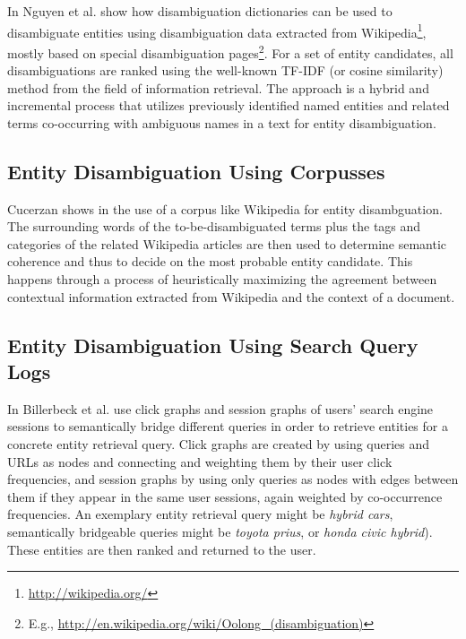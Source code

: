 \documentclass[twocolumn]{article}
\begin{document}
In \cite{Nguyen:NamedEntity} Nguyen et al. show how disambiguation dictionaries can be used to disambiguate entities
using disambiguation data extracted from Wikipedia\footnote{\url{http://wikipedia.org/}}, mostly based on special
disambiguation pages\footnote{E.g., \url{http://en.wikipedia.org/wiki/Oolong_(disambiguation)}}. For a set of entity
candidates, all disambiguations are ranked using the well-known TF-IDF (or cosine similarity) method from the field of
information retrieval. The approach is a hybrid and incremental process that utilizes previously identified named
entities and related terms co-occurring with ambiguous names in a text for entity disambiguation.

\subsection{Entity Disambiguation Using Corpusses}

Cucerzan shows in \cite{Cucerzan:Wikipedia} the use of a corpus like Wikipedia for entity disambguation. The
surrounding words of the to-be-disambiguated terms plus the tags and categories of the related Wikipedia articles are
then used to determine semantic coherence and thus to decide on the most probable entity candidate. This happens
through a process of heuristically maximizing the agreement between contextual information extracted from Wikipedia and
the context of a document.

\subsection{Entity Disambiguation Using Search Query Logs}

In \cite{Billerbeck:QueryLogs} Billerbeck et al. use click graphs and session graphs of users' search engine sessions
to semantically bridge different queries in order to retrieve entities for a concrete entity retrieval query. Click
graphs are created by using queries and URLs as nodes and connecting and weighting them by their user click
frequencies, and session graphs by using only queries as nodes with edges between them if they appear in the same user
sessions, again weighted by co-occurrence frequencies. An exemplary entity retrieval query might be \textit{hybrid
cars}, semantically bridgeable queries might be \textit{toyota prius}, or \textit{honda civic hybrid}). These entities
are then ranked and returned to the user.
\end{document}

